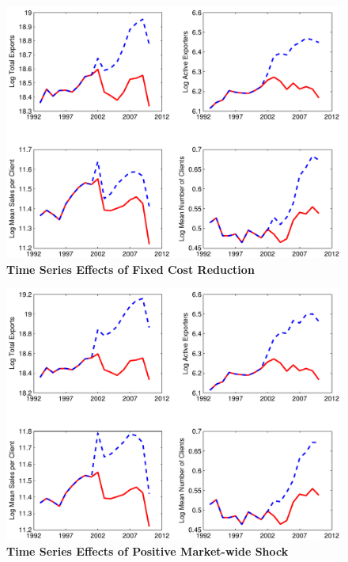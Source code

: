 \begin{figure}[tbp]
\centering
\includegraphics[width=\textwidth]{figures/figure4-eps-converted-to.pdf}
\caption{\textbf{Time Series Effects of Fixed Cost Reduction}}
\label{fig:cost_dec_subplot}
\end{figure}
\newpage

\begin{figure}[tbp]
\centering
\includegraphics[width=\textwidth]{figures/figure5-eps-converted-to.pdf}
\caption{\textbf{Time Series Effects of Positive Market-wide Shock}}
\label{fig:mac_bump_subplot}
\end{figure}


